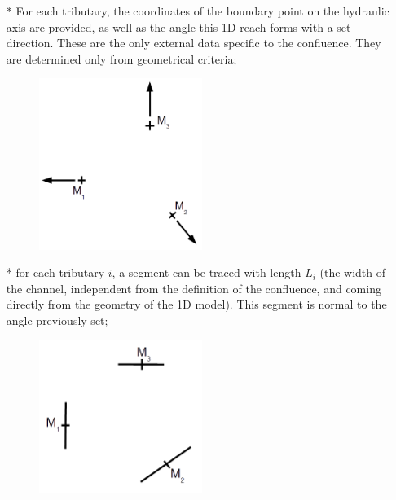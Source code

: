 \begin{itemize}
 \item[*] For each tributary, the coordinates of the boundary point on the hydraulic axis are provided, as well as the angle this 1D reach forms with a set direction. These are the only external data specific to the confluence. They are determined only from geometrical criteria;
  \begin{figure}[H]
    \begin{center}
     \includegraphics[width=0.5\textwidth]{Figures/cr1.png}
    \end{center}
  \end{figure}

 \item[*] for each tributary $i$, a segment can be traced with length $L_i$ (the width of the channel, independent from the definition of the confluence, and coming directly from the geometry of the 1D model). This segment is normal to the angle previously set;
  \begin{figure}[H]
    \begin{center}
     \includegraphics[width=0.5\textwidth]{Figures/cr2.png}
    \end{center}
  \end{figure}


\end{itemize}
